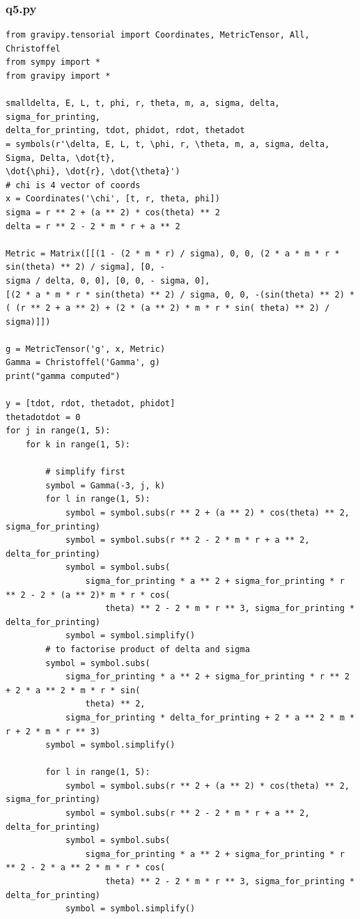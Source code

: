 \documentclass[10pt,a4paper]{report}
\begin{document}
\subsubsection*{q5.py}
\small
\begin{verbatim}
from gravipy.tensorial import Coordinates, MetricTensor, All, Christoffel
from sympy import *
from gravipy import *

smalldelta, E, L, t, phi, r, theta, m, a, sigma, delta, sigma_for_printing,
delta_for_printing, tdot, phidot, rdot, thetadot 
= symbols(r'\delta, E, L, t, \phi, r, \theta, m, a, sigma, delta, Sigma, Delta, \dot{t}, 
\dot{\phi}, \dot{r}, \dot{\theta}')
# chi is 4 vector of coords
x = Coordinates('\chi', [t, r, theta, phi])
sigma = r ** 2 + (a ** 2) * cos(theta) ** 2
delta = r ** 2 - 2 * m * r + a ** 2

Metric = Matrix([[(1 - (2 * m * r) / sigma), 0, 0, (2 * a * m * r * sin(theta) ** 2) / sigma], [0, -
sigma / delta, 0, 0], [0, 0, - sigma, 0], 
[(2 * a * m * r * sin(theta) ** 2) / sigma, 0, 0, -(sin(theta) ** 2) * 
( (r ** 2 + a ** 2) + (2 * (a ** 2) * m * r * sin( theta) ** 2) / sigma)]])

g = MetricTensor('g', x, Metric)
Gamma = Christoffel('Gamma', g)
print("gamma computed")

y = [tdot, rdot, thetadot, phidot]
thetadotdot = 0
for j in range(1, 5):
    for k in range(1, 5):

        # simplify first
        symbol = Gamma(-3, j, k)
        for l in range(1, 5):
            symbol = symbol.subs(r ** 2 + (a ** 2) * cos(theta) ** 2, sigma_for_printing)
            symbol = symbol.subs(r ** 2 - 2 * m * r + a ** 2, delta_for_printing)
            symbol = symbol.subs(
                sigma_for_printing * a ** 2 + sigma_for_printing * r ** 2 - 2 * (a ** 2)* m * r * cos(
                    theta) ** 2 - 2 * m * r ** 3, sigma_for_printing * delta_for_printing)
            symbol = symbol.simplify()
        # to factorise product of delta and sigma
        symbol = symbol.subs(
            sigma_for_printing * a ** 2 + sigma_for_printing * r ** 2 + 2 * a ** 2 * m * r * sin(
                theta) ** 2,
            sigma_for_printing * delta_for_printing + 2 * a ** 2 * m * r + 2 * m * r ** 3)
        symbol = symbol.simplify()

        for l in range(1, 5):
            symbol = symbol.subs(r ** 2 + (a ** 2) * cos(theta) ** 2, sigma_for_printing)
            symbol = symbol.subs(r ** 2 - 2 * m * r + a ** 2, delta_for_printing)
            symbol = symbol.subs(
                sigma_for_printing * a ** 2 + sigma_for_printing * r ** 2 - 2 * a ** 2 * m * r * cos(
                    theta) ** 2 - 2 * m * r ** 3, sigma_for_printing * delta_for_printing)
            symbol = symbol.simplify()


\end{verbatim}
\end{document}
